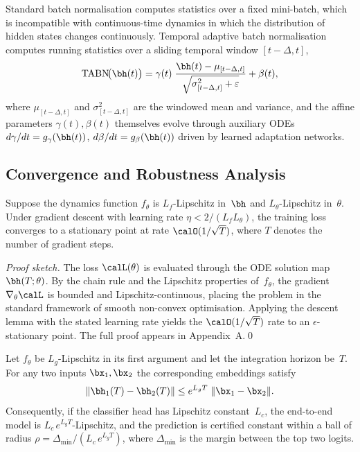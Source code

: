 Standard batch normalisation computes statistics over a fixed mini-batch, which is incompatible with continuous-time dynamics in which the distribution of hidden states changes continuously. Temporal adaptive batch normalisation computes running statistics over a sliding temporal window $[t-\Delta,t]$,
\begin{equation}
\mathrm{TABN}\!\bigl(\bh(t)\bigr)
= \gamma(t)\;\frac{\bh(t)-\mu_{[t-\Delta,t]}}
  {\sqrt{\sigma^2_{[t-\Delta,t]}+\varepsilon}}
+ \beta(t),
\label{eq:tabn}
\end{equation}
where $\mu_{[t-\Delta,t]}$ and $\sigma^2_{[t-\Delta,t]}$ are the windowed mean and variance, and the affine parameters $\gamma(t),\beta(t)$ themselves evolve through auxiliary ODEs $d\gamma/dt=g_\gamma(\bh(t))$, $d\beta/dt=g_\beta(\bh(t))$ driven by learned adaptation networks.

\subsection{Convergence and Robustness Analysis}

\begin{theorem}
\label{thm:ct_tgnn_conv}
Suppose the dynamics function $f_\theta$ is $L_f$-Lipschitz in~$\bh$ and $L_\theta$-Lipschitz in~$\theta$. Under gradient descent with learning rate $\eta<2/(L_f L_\theta)$, the training loss converges to a stationary point at rate $\calO(1/\sqrt{T})$, where $T$ denotes the number of gradient steps.
\end{theorem}

\noindent\textit{Proof sketch.} The loss $\calL(\theta)$ is evaluated through the ODE solution map $\bh(T;\theta)$. By the chain rule and the Lipschitz properties of~$f_\theta$, the gradient $\nabla_\theta\calL$ is bounded and Lipschitz-continuous, placing the problem in the standard framework of smooth non-convex optimisation. Applying the descent lemma with the stated learning rate yields the $\calO(1/\sqrt{T})$ rate to an $\epsilon$-stationary point. The full proof appears in Appendix~A.\qed

\begin{theorem}
\label{thm:ct_tgnn_rob}
Let $f_\theta$ be $L_g$-Lipschitz in its first argument and let the integration horizon be~$T$. For any two inputs $\bx_1,\bx_2$ the corresponding embeddings satisfy
\begin{equation}
\|\bh_1(T)-\bh_2(T)\|
\le e^{L_g T}\;\|\bx_1-\bx_2\|.
\label{eq:lip_cert}
\end{equation}
Consequently, if the classifier head has Lipschitz constant~$L_c$, the end-to-end model is $L_c\,e^{L_g T}$-Lipschitz, and the prediction is certified constant within a ball of radius $\rho = \Delta_{\min}/(L_c\,e^{L_g T})$, where $\Delta_{\min}$ is the margin between the top two logits.
\end{theorem}

